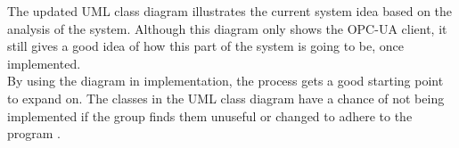 The updated UML class diagram illustrates the current system idea based on the 
analysis of the system. Although this diagram only shows the 
OPC-UA client, it still gives a good idea of how this part of the system is going
to be, once implemented. \\

By using the diagram in implementation, the process gets a good starting point 
to expand on. The classes in the UML class diagram have a chance of not being 
implemented if the group finds them unuseful or changed to adhere to the program
.